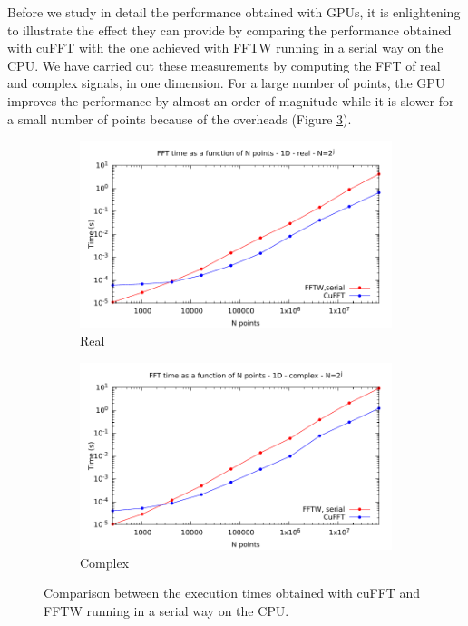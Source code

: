 \documentclass[12pt, a4paper]{article}
\begin{document}
Before we study in detail the performance obtained with GPUs, it is
enlightening to illustrate the effect they can provide by comparing
the performance obtained with cuFFT with the one achieved with FFTW
\cite{fftw} running in a serial way on the CPU. We have carried out
these measurements by computing the FFT of real and complex signals,
in one dimension. For a large number of points, the GPU improves the
performance by almost an order of magnitude while it is slower for a
small number of points because of the overheads (Figure
\ref{COMPGPUCPU}).
\begin{figure}[htb]
\captionsetup{width=0.8\linewidth}
\centering
\begin{subfigure}{.5\textwidth}
\centering
\includegraphics[width=.9\linewidth]{graphs/gpucpucomparison-r.pdf}
\caption{Real}
\label{GPUCPUR}
\end{subfigure}%
\begin{subfigure}{.5\textwidth}
\centering
\includegraphics[width=.9\linewidth]{graphs/gpucpucomparison-c.pdf}
\caption{Complex}
\label{GPUCPUC}
\end{subfigure}
\caption{Comparison between the execution times obtained with cuFFT and FFTW running in a serial way on the CPU.}
\label{COMPGPUCPU}
\end{figure}
\end{document}
